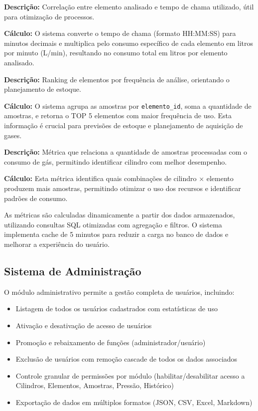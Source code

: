 \documentclass[12pt,a4paper]{article}
\providecommand\关键字[1]{\textbf{#1}}
\begin{document}
\textbf{Descrição:} Correlação entre elemento analisado e tempo de chama utilizado, útil para otimização de processos.

\textbf{Cálculo:} O sistema converte o tempo de chama (formato HH:MM:SS) para minutos decimais e multiplica pelo consumo específico de cada elemento em litros por minuto (L/min), resultando no consumo total em litros por elemento analisado.


\textbf{Descrição:} Ranking de elementos por frequência de análise, orientando o planejamento de estoque.

\textbf{Cálculo:} O sistema agrupa as amostras por \texttt{elemento\_id}, soma a quantidade de amostras, e retorna o TOP 5 elementos com maior frequência de uso. Esta informação é crucial para previsões de estoque e planejamento de aquisição de gases.


\textbf{Descrição:} Métrica que relaciona a quantidade de amostras processadas com o consumo de gás, permitindo identificar cilindro com melhor desempenho.

\textbf{Cálculo:} Esta métrica identifica quais combinações de cilindro × elemento produzem mais amostras, permitindo otimizar o uso dos recursos e identificar padrões de consumo.

As métricas são calculadas dinamicamente a partir dos dados armazenados, utilizando consultas SQL otimizadas com agregação e filtros. O sistema implementa cache de 5 minutos para reduzir a carga no banco de dados e melhorar a experiência do usuário.

\subsection{Sistema de Administração}

O módulo administrativo permite a gestão completa de usuários, incluindo:

\begin{itemize}
\item Listagem de todos os usuários cadastrados com estatísticas de uso
\item Ativação e desativação de acesso de usuários
\item Promoção e rebaixamento de funções (administrador/usuário)
\item Exclusão de usuários com remoção cascade de todos os dados associados
\item Controle granular de permissões por módulo (habilitar/desabilitar acesso a Cilindros, Elementos, Amostras, Pressão, Histórico)
\item Exportação de dados em múltiplos formatos (JSON, CSV, Excel, Markdown)
\end{itemize}
\end{document}
